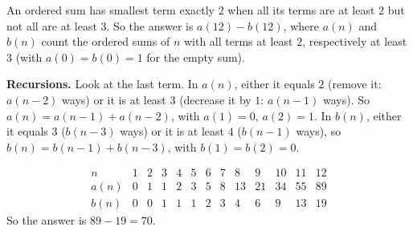 An ordered sum has smallest term exactly $2$ when all its terms are at least $2$ but not all are at least $3$. So the answer is $a(12)-b(12)$, where $a(n)$ and $b(n)$ count the ordered sums of $n$ with all terms at least $2$, respectively at least $3$ (with $a(0)=b(0)=1$ for the empty sum).

\textbf{Recursions.} Look at the last term. In $a(n)$, either it equals $2$ (remove it: $a(n-2)$ ways) or it is at least $3$ (decrease it by $1$: $a(n-1)$ ways). So $a(n)=a(n-1)+a(n-2)$, with $a(1)=0$, $a(2)=1$. In $b(n)$, either it equals $3$ ($b(n-3)$ ways) or it is at least $4$ ($b(n-1)$ ways), so $b(n)=b(n-1)+b(n-3)$, with $b(1)=b(2)=0$.

\[\begin{array}{c|cccccccccccc}
n&1&2&3&4&5&6&7&8&9&10&11&12\\\hline
a(n)&0&1&1&2&3&5&8&13&21&34&55&89\\
b(n)&0&0&1&1&1&2&3&4&6&9&13&19
\end{array}\]
So the answer is $89-19=\boxed{70}$.
